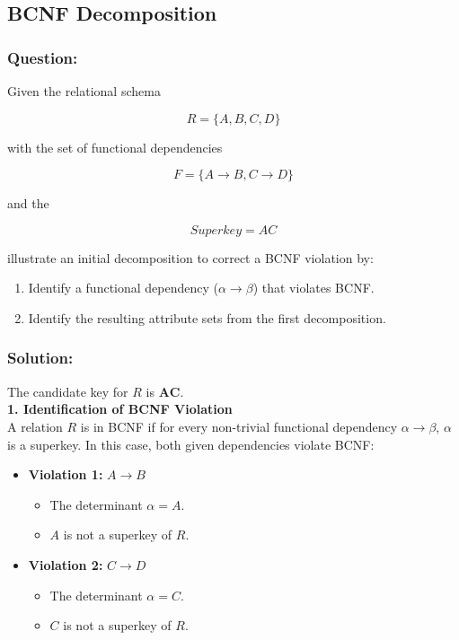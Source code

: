 \documentclass{article}
\begin{document}
\subsection{BCNF Decomposition}

\subsubsection*{Question:}
Given the relational schema

$$R = \{A, B, C, D\}$$

with the set of functional dependencies

$$F = \{ A \rightarrow B, C \rightarrow D \}$$

and the

$$Superkey = AC$$

illustrate an initial decomposition to correct a BCNF violation by:

\begin{enumerate}
    \item Identify a functional dependency ($\alpha \rightarrow \beta$) that violates BCNF.
    \item Identify the resulting attribute sets from the first decomposition.
\end{enumerate}

\subsubsection*{Solution:}
The candidate key for $R$ is $\mathbf{AC}$. \\

\textbf{1. Identification of BCNF Violation} \\

A relation $R$ is in BCNF if for every non-trivial functional dependency $\alpha \rightarrow \beta$, $\alpha$ is a superkey. In this case, both given dependencies violate BCNF:

\begin{itemize}
    \item \textbf{Violation 1:} $A \rightarrow B$
        \begin{itemize}
            \item The determinant $\alpha = A$.
            \item $A$ is not a superkey of $R$.
        \end{itemize}
    \item \textbf{Violation 2:} $C \rightarrow D$
        \begin{itemize}
            \item The determinant $\alpha = C$.
            \item $C$ is not a superkey of $R$.
        \end{itemize}
\end{itemize}
\end{document}
